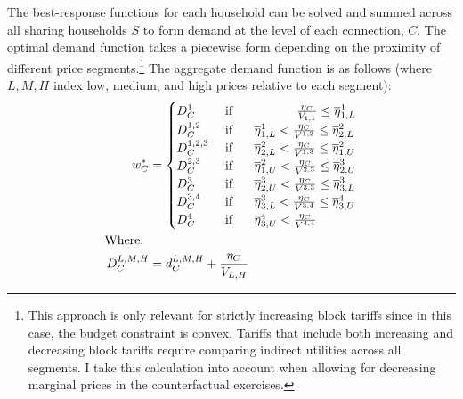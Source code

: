 \documentclass[12pt]{article}
\begin{document}
The best-response functions for each household can be solved and summed across all sharing households $S$ to form demand at the level of each connection, $C$.  The optimal demand function takes a piecewise form depending on the proximity of different price segments.\footnote{This approach is only relevant for strictly increasing block tariffs since in this case, the budget constraint is convex.  Tariffs that include both increasing and decreasing block tariffs require comparing indirect utilities across all segments.  I take this calculation into account when allowing for decreasing marginal prices in the counterfactual exercises.}  The aggregate demand function is as follows (where $L,M,H$ index low, medium, and high prices relative to each segment):
\begin{align}\label{equation:generaldemand}
\begin{split}
w^{*}_C &=
\begin{cases}
D^{1}_C   & \text{ if } \hspace{1.7cm}                                               \frac{ \eta_C }{ V_{1,1} }  \leq \overline{\eta}^{1}_{1,L}  \\
D^{1,2}_C   & \text{ if } \hspace{.5cm} \overline{\eta}^{1}_{1,L} <    \frac{ \eta_C }{ V^{1,2} }    \leq \overline{\eta}^{2}_{2,L}  \\
D^{1,2,3}_C   & \text{ if } \hspace{.5cm} \overline{\eta}^{2}_{2,L} <    \frac{ \eta_C }{ V^{1,3} }    \leq \overline{\eta}^{2}_{1,U}  \\
D^{2,3}_C   & \text{ if } \hspace{.5cm} \overline{\eta}^{2}_{1,U} <    \frac{ \eta_C }{ V^{2,3} }    \leq \overline{\eta}^{3}_{2,U}  \\ 
D^{3}_C   & \text{ if } \hspace{.5cm} \overline{\eta}^{3}_{2,U} <    \frac{ \eta_C }{ V^{3,3} }    \leq \overline{\eta}^{3}_{3,L}  \\ 
D^{3,4}_C   & \text{ if } \hspace{.5cm} \overline{\eta}^{3}_{3,L} <    \frac{ \eta_C }{ V^{3,4} }    \leq \overline{\eta}^{4}_{3,U}  \\ 
D^{4}_C   & \text{ if } \hspace{.5cm} \overline{\eta}^{4}_{3,U} <    \frac{ \eta_C }{ V^{4,4} }  
\end{cases}\\
\text{Where: } & \\
D^{L,M,H}_C        		&=  d^{L,M,H}_C + \frac{ \eta_C }{ V_{L,H} }   \\

\end{split}
\end{align}
\end{document}
